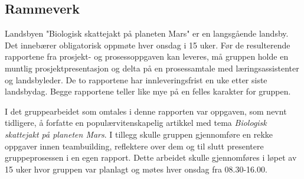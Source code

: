 \subsection{Rammeverk}

Landsbyen "Biologisk skattejakt på planeten Mars" er en langsgående landsby.
Det innebærer obligatorisk oppmøte hver onsdag i 15 uker. Før de resulterende rapportene fra prosjekt- og prosessoppgaven kan leveres, må gruppen holde en muntlig prosjektpresentasjon og delta på en prosessamtale med læringsassistenter og landsbyleder.
De to rapportene har innleveringsfrist en uke etter siste landsbydag. Begge rapportene teller like mye på en felles karakter for gruppen.

I det gruppearbeidet som omtales i denne rapporten var oppgaven, som nevnt tidligere, å forfatte en populærvitenskapelig artikkel med tema \textit{Biologisk skattejakt på planeten Mars}. I tillegg skulle gruppen gjennomføre en rekke oppgaver innen teambuilding, reflektere over dem og til slutt presentere gruppeprosessen i en egen rapport. 
Dette arbeidet skulle gjennomføres i løpet av 15 uker hvor gruppen var planlagt og møtes hver onsdag fra 08.30-16.00.
